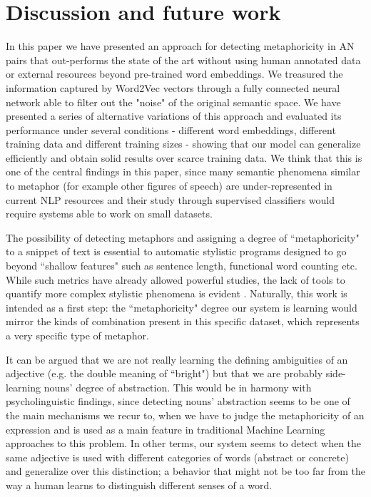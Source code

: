\section{Discussion and future work}

In this paper we have presented an approach for detecting metaphoricity in AN pairs that out-performs the state of the art without using human annotated data or external resources beyond pre-trained word embeddings. We treasured the information captured by Word2Vec vectors through a fully connected neural network able to filter out the "noise" of the original semantic space. We have presented a series of alternative variations of this approach and evaluated its performance under several conditions - different word embeddings, different training data and different training sizes - showing that our model can generalize efficiently and obtain solid results over scarce training data.  We think that this is one of the central findings in this paper, since many semantic phenomena similar to metaphor (for example other figures of speech) are under-represented in current NLP resources and their study through supervised classifiers would require systems able to work on small datasets.  


The possibility of detecting metaphors and assigning a degree of ``metaphoricity" to a snippet of text is essential to automatic stylistic programs designed to go beyond ``shallow features" such as sentence length, functional word counting etc. While such metrics have already allowed powerful studies, the lack of tools to quantify more complex stylistic phenomena is evident \citep{hughes2012quantitative,gibbs2017metaphor}.  Naturally, this work is intended as a first step: the  ``metaphoricity" degree our system is learning would mirror the kinds of combination present in this specific dataset, which represents a very specific type of metaphor. 


It can be argued that we are not really learning the defining ambiguities of an adjective (e.g. the double meaning of ``bright") but that we are probably side-learning nouns' degree of abstraction. This would be in harmony with psycholinguistic findings, since detecting nouns' abstraction seems to be one of the main mechanisms we recur to, when we have to judge the metaphoricity of an expression \cite{cogni15} and is used as a main feature in traditional Machine Learning approaches to this problem. In other terms, our system seems to detect when the same adjective is used with different categories of words (abstract or concrete) and generalize over this distinction; a behavior that might not be too far from the way a human learns to distinguish different senses of a word. 



